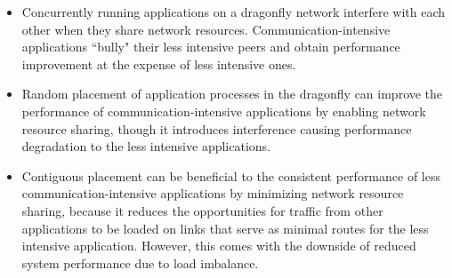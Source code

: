 


\begin{itemize}
   
    \item Concurrently running applications on a dragonfly network interfere with each other when they share network resources. Communication-intensive applications ``bully" their less intensive peers and obtain performance improvement at the expense of less intensive ones. 
    
    \item Random placement of application processes in the dragonfly can improve the performance of communication-intensive applications by enabling network resource sharing, though it introduces interference causing performance degradation to the less intensive applications.
    
   \item Contiguous placement can be beneficial to the consistent performance of less communication-intensive applications by minimizing network resource sharing, because it reduces the opportunities for traffic from other applications to be loaded on links that serve as minimal routes for the less intensive application. However, this comes with the downside of reduced system performance due to load imbalance.
    
        
\end{itemize}

